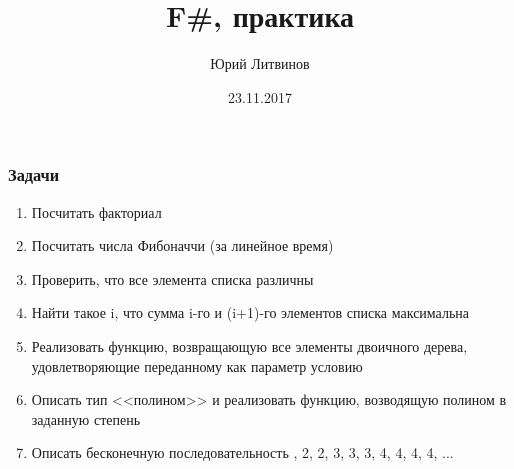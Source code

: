 \documentclass[xetex,mathserif,serif]{beamer}
\title{F\#, практика}
\author{Юрий Литвинов}
\date{23.11.2017}
\begin{document}
	\frame{\titlepage}

	\begin{frame}
		\frametitle{Задачи}
		\begin{enumerate}
			\item Посчитать факториал
			\item Посчитать числа Фибоначчи (за линейное время)
			\item Проверить, что все элемента списка различны
			\item Найти такое i, что сумма i-го и (i+1)-го элементов списка максимальна
			\item Реализовать функцию, возвращающую все элементы двоичного дерева, удовлетворяющие переданному как параметр условию
			\item Описать тип <<полином>> и реализовать функцию, возводящую полином в заданную степень
			\item Описать бесконечную последовательность , 2, 2, 3, 3, 3, 4, 4, 4, 4, ...
		\end{enumerate}
	\end{frame}
\end{document}
